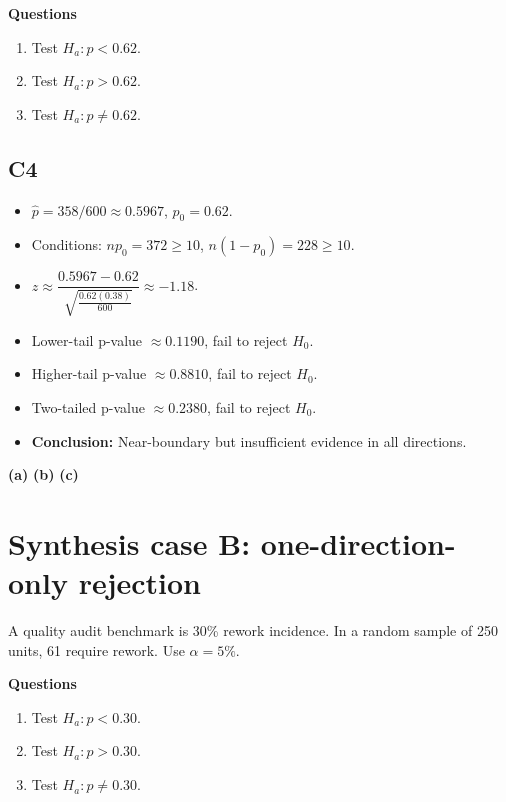 \textbf{Questions}
\begin{enumerate}
    \item[(a)] Test \(H_a\colon p<0.62\).
    \item[(b)] Test \(H_a\colon p>0.62\).
    \item[(c)] Test \(H_a\colon p\ne0.62\).
\end{enumerate}

\subsection*{C4}
\begin{itemize}
    \item \(\hat p=358/600\approx0.5967\), \(p_0=0.62\).
    \item Conditions: \(np_0=372\ge10\), \(n(1-p_0)=228\ge10\).
    \item \(z\approx \dfrac{0.5967-0.62}{\sqrt{\frac{0.62(0.38)}{600}}}\approx -1.18\).
    \item Lower-tail p-value \(\approx 0.1190\), fail to reject \(H_0\).
    \item Higher-tail p-value \(\approx 0.8810\), fail to reject \(H_0\).
    \item Two-tailed p-value \(\approx 0.2380\), fail to reject \(H_0\).
    \item \textbf{Conclusion:} Near-boundary but insufficient evidence in all directions.
\end{itemize}

\begin{center}
\textbf{(a)}\;
\hspace{0.5cm}
\textbf{(b)}\;
\hspace{0.5cm}
\textbf{(c)}\;
\end{center}


\section{Synthesis case B: one-direction-only rejection}
A quality audit benchmark is 30\% rework incidence. In a random sample of 250 units, 61 require rework. Use \(\alpha=5\%\).

\textbf{Questions}
\begin{enumerate}
    \item[(a)] Test \(H_a\colon p<0.30\).
    \item[(b)] Test \(H_a\colon p>0.30\).
    \item[(c)] Test \(H_a\colon p\ne0.30\).
\end{enumerate}

